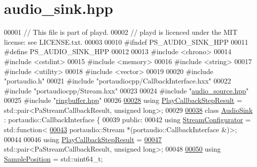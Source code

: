 \hypertarget{audio__sink_8hpp_source}{\section{audio\+\_\+sink.\+hpp}
\label{audio__sink_8hpp_source}
}

\begin{DoxyCode}
00001 \textcolor{comment}{// This file is part of playd.}
00002 \textcolor{comment}{// playd is licenced under the MIT license: see LICENSE.txt.}
00003 
00010 \textcolor{preprocessor}{#ifndef PS\_AUDIO\_SINK\_HPP}
00011 \textcolor{preprocessor}{#define PS\_AUDIO\_SINK\_HPP}
00012 
00013 \textcolor{preprocessor}{#include <chrono>}
00014 \textcolor{preprocessor}{#include <cstdint>}
00015 \textcolor{preprocessor}{#include <memory>}
00016 \textcolor{preprocessor}{#include <string>}
00017 \textcolor{preprocessor}{#include <utility>}
00018 \textcolor{preprocessor}{#include <vector>}
00019 
00020 \textcolor{preprocessor}{#include "portaudio.h"}
00021 \textcolor{preprocessor}{#include "portaudiocpp/CallbackInterface.hxx"}
00022 \textcolor{preprocessor}{#include "portaudiocpp/Stream.hxx"}
00023 
00024 \textcolor{preprocessor}{#include "\hyperlink{audio__source_8hpp}{audio\_source.hpp}"}
00025 \textcolor{preprocessor}{#include "\hyperlink{ringbuffer_8hpp}{ringbuffer.hpp}"}
00026 
\hypertarget{audio__sink_8hpp_source_l00028}{}\hyperlink{audio__sink_8hpp_af1e317131d6c3a3f0adf7c5fca059d74}{00028} \textcolor{keyword}{using} \hyperlink{audio__sink_8hpp_af1e317131d6c3a3f0adf7c5fca059d74}{PlayCallbackStepResult} = std::pair<PaStreamCallbackResult, unsigned long>;
00029 
\hypertarget{audio__sink_8hpp_source_l00038}{}\hyperlink{classAudioSink}{00038} \textcolor{keyword}{class }\hyperlink{classAudioSink}{AudioSink} : portaudio::CallbackInterface \{
00039 \textcolor{keyword}{public}:
00042     \textcolor{keyword}{using} \hyperlink{classAudioSink_ae5b8370aa17c24c6fc8f8e0c5778168c}{StreamConfigurator} = std::function<
\hypertarget{audio__sink_8hpp_source_l00043}{}\hyperlink{classAudioSink_ae5b8370aa17c24c6fc8f8e0c5778168c}{00043}                     portaudio::Stream *(portaudio::CallbackInterface &)>;
00044 
00046     \textcolor{keyword}{using} \hyperlink{classAudioSink_a73002cc57611ac384c4e9d419e706e50}{PlayCallbackStepResult} =
\hypertarget{audio__sink_8hpp_source_l00047}{}\hyperlink{classAudioSink_a73002cc57611ac384c4e9d419e706e50}{00047}                     std::pair<PaStreamCallbackResult, unsigned long>;
00048 
\hypertarget{audio__sink_8hpp_source_l00050}{}\hyperlink{classAudioSink_ad2d7d33b3e937d057a4d72afad812737}{00050}     \textcolor{keyword}{using} \hyperlink{classAudioSink_ad2d7d33b3e937d057a4d72afad812737}{SamplePosition} = std::uint64\_t;

\end{DoxyCode}
